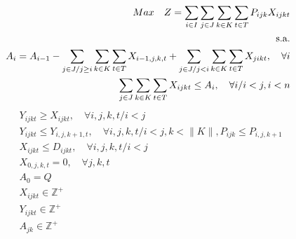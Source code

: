 \begin{eqnarray}
	&& Max \quad Z = \sum_{i\in I} \sum_{j\in J} \sum_{k\in K} \sum_{t\in T} P_{ijk} X_{ijkt} \label{eq: m1_ecu1}                                                                    \\
	&& \text{s.a.}  \notag                                                                                                                                                    \\
	&& A_{i} = A_{i-1} - \sum_{j\in J/j \geq i}\sum_{k\in K}\sum_{t\in T}X_{i-1,j,k,t} + \sum_{j\in J /j<i}\sum_{k\in K}\sum_{t\in T}X_{jikt}, \quad \forall i  \label{eq: m1_ecu2}  \\
	&& \sum_{j \in J}\sum_{k\in K}\sum_{t\in T} X_{ijkt} \leq A_{i} , \quad \forall i/i<j, i < n                                                \label{eq: m1_ecu3}
\end{eqnarray}
\begin{eqnarray}
	&& Y_{ijkt} \geq X_{ijkt},  \quad \forall i,j,k,t/ i < j                                                                          \label{eq: m1_ecu4}                            \\
	&& Y_{ijkt} \leq Y_{i,j,k+1,t},  \quad \forall i,j,k,t / i < j, k < \lVert K \rVert,  P_{ijk} \leq P_{i,j,k+1}                      \label{eq: m1_ecu5}                          \\
	&& X_{ijkt} \leq D_{ijkt},  \quad \forall i,j,k,t/ i < j                                                                           \label{eq: m1_ecu6}                           \\[15pt]
	&& X_{0,j,k,t} = 0,     \quad \forall j,k,t                                                                                        \label{eq: m1_ecu7}                           \\
	&& A_{0} = Q                                                                                                                      \label{eq: m1_ecu8}                            \\
	&& X_{ijkt} \in \mathbb{Z}^+                                                                                                   \label{eq: m1_ecu9}                               \\
	&& Y_{ijkt} \in \mathbb{Z}^+                                                                                                   \label{eq: m1_ecu10}                              \\
	&& A_{jk} \in \mathbb{Z}^+                                                                                                   \label{eq: m1_ecu11}
\end{eqnarray}


